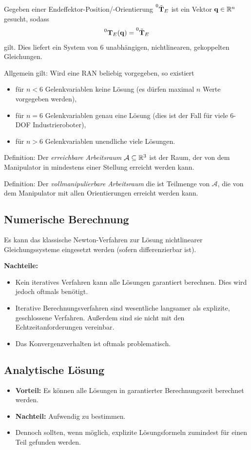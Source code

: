 		Gegeben einer Endeffektor-Position/-Orientierung \( \prescript{0}{}{\tilde{\boldsymbol{\mathrm{T}}}}_E \) ist ein Vektor \( \boldsymbol{\mathrm{q}} \in \mathbb{R}^n \) gesucht, sodass
		\begin{equation*}
			\prescript{0}{}{\boldsymbol{\mathrm{T}}}_E(\boldsymbol{\mathrm{q}}) = \prescript{0}{}{\tilde{\boldsymbol{\mathrm{T}}}}_E
		\end{equation*}
		gilt. Dies liefert ein System von \(6\) unabhängigen, nichtlinearen, gekoppelten Gleichungen.
		
		Allgemein gilt: Wird eine RAN beliebig vorgegeben, so existiert
		\begin{itemize}
			\item für \( n < 6 \) Gelenkvariablen \iA keine Lösung (es dürfen maximal \(n\) Werte vorgegeben werden),
			\item für \( n = 6 \) Gelenkvariablen \iA genau eine Lösung (dies ist der Fall für viele \num{6}-DOF Industrieroboter),
			\item für \( n > 6 \) Gelenkvariablen \iA unendliche viele Lösungen.
		\end{itemize}
	
		Definition: Der \emph{erreichbare Arbeitsraum} \(\mathcal{A} \subseteq \mathbb{R}^3\) ist der Raum, der von dem Manipulator in mindestens einer Stellung erreicht werden kann.
		
		Definition: Der \emph{vollmanipulierbare Arbeitsraum} die ist Teilmenge von \(\mathcal{A}\), die von dem Manipulator mit allen Orientierungen erreicht werden kann.

		\subsection{Numerische Berechnung}
			Es kann \bspw das klassische Newton-Verfahren zur Lösung nichtlinearer Gleichungssysteme eingesetzt werden (sofern \DIRKIN differenzierbar ist).
			
			\textbf{Nachteile:}
			\begin{itemize}
				\item Kein iteratives Verfahren kann alle Lösungen garantiert berechnen. Dies wird jedoch oftmals benötigt.
				\item Iterative Berechnungsverfahren sind wesentliche langsamer als explizite, geschlossene Verfahren. Außerdem sind sie nicht mit den Echtzeitanforderungen vereinbar.
				\item Das Konvergenzverhalten ist oftmals problematisch.
			\end{itemize}

		\subsection{Analytische Lösung}
			\begin{itemize}
				\item \textbf{Vorteil:} Es können alle Lösungen in garantierter Berechnungszeit berechnet werden.
				\item \textbf{Nachteil:} Aufwendig zu bestimmen.
				\item Dennoch sollten, wenn möglich, explizite Lösungsformeln zumindest für einen Teil gefunden werden.
			\end{itemize}
		
